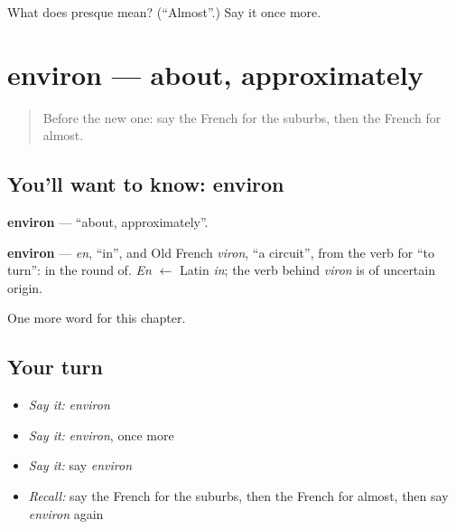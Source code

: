 \begin{tcolorbox}[breakable,colback=teal!4,colframe=teal!35!black,title={Before you move on}]
What does presque mean? (\textquotedblleft{}Almost\textquotedblright{}.) Say it once more.
\end{tcolorbox}
\section[environ]{environ — about, approximately}

\label{lesson:FR-C217-environ}



\begin{quote}
Before the new one: say the French for the suburbs, then the French for almost.
\end{quote}

\subsection*{You'll want to know: environ}
\textbf{environ} — \textquotedblleft{}about, approximately\textquotedblright{}.

\begin{cousinweb}
\textbf{environ} — \emph{en}, \textquotedblleft{}in\textquotedblright{}, and Old French \emph{viron}, \textquotedblleft{}a circuit\textquotedblright{}, from the verb for \textquotedblleft{}to turn\textquotedblright{}: in the round of. \emph{En} $\leftarrow$ Latin \emph{in}; the verb behind \emph{viron} is of uncertain origin.
\end{cousinweb}

\begin{grammarlens}[title={What you've built}]
One more word for this chapter.
\end{grammarlens}

\subsection*{Your turn}
\begin{itemize}
\raggedright
  \item \emph{Say it:} \emph{environ}
  \item \emph{Say it:} \emph{environ}, once more
  \item \emph{Say it:} say \emph{environ}
  \item \emph{Recall:} say the French for the suburbs, then the French for almost, then say \emph{environ} again
\end{itemize}

